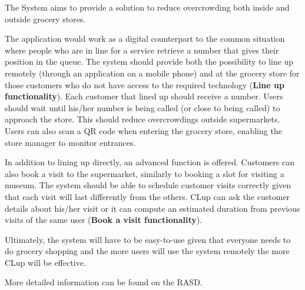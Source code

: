 The System aims to provide a solution to reduce overcrowding both inside and outside grocery stores.

\medskip
The application would work as a digital counterpart to the common situation where people who are in line for a service retrieve a number that gives their position in the queue.
The system should provide both the possibility to line up remotely (through an application on a mobile phone) and at the grocery store for those customers who do not have access to the required technology (\textbf{Line up functionality}).
Each customer that lined up should receive a number. Users should wait until his/her number is being called (or close to being called) to approach the store. This should reduce overcrowdings outside supermarkets.
Users can also scan a QR code when entering the grocery store, enabling the store manager to monitor entrances.

\medskip
In addition to lining up directly, an advanced function is offered. Customers can also book a visit to the supermarket, similarly to booking a slot for visiting a museum. The system should be able to schedule customer visits correctly given that each visit will last differently from the others.  
CLup can ask the customer details about his/her visit or it can compute an estimated duration from previous visits of the same user (\textbf{Book a visit functionality}).

\medskip
Ultimately, the system will have to be easy-to-use given that everyone needs to do grocery shopping and the more users will use the system remotely the more CLup will be effective.

\medskip
More detailed information can be found on the RASD.